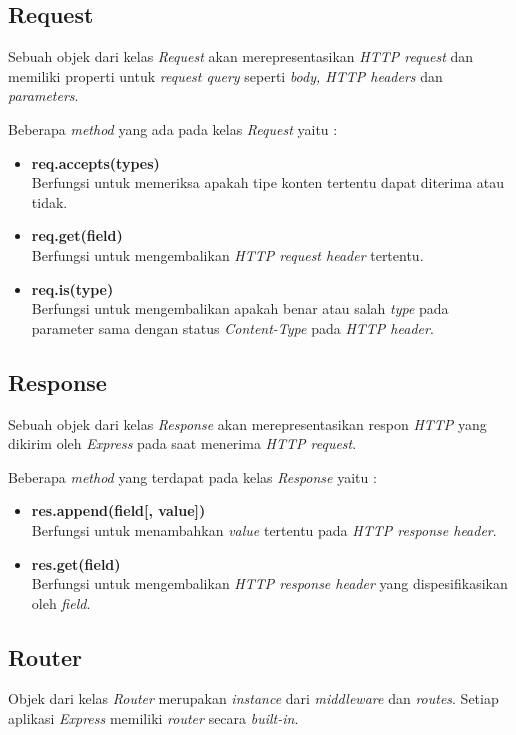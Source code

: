 \subsection{Request}
Sebuah objek dari kelas \textit{Request} akan merepresentasikan \textit{HTTP request} dan memiliki properti untuk \textit{request query} seperti \textit{body, HTTP headers} dan \textit{parameters}. 

Beberapa \textit{method} yang ada pada kelas \textit{Request} yaitu : 
\begin{itemize}
	\item \textbf{req.accepts(types)} \\ Berfungsi untuk memeriksa apakah tipe konten tertentu dapat diterima atau tidak.
	\item \textbf{req.get(field)} \\ Berfungsi untuk mengembalikan \textit{HTTP request header} tertentu.
	\item \textbf{req.is(type)} \\ Berfungsi untuk mengembalikan apakah benar atau salah \textit{type} pada parameter sama dengan status \textit{Content-Type} pada \textit{HTTP header}.
\end{itemize}

\subsection{Response}
Sebuah objek dari kelas \textit{Response} akan merepresentasikan respon \textit{HTTP} yang dikirim oleh \textit{Express} pada saat menerima \textit{HTTP request}.

Beberapa \textit{method} yang terdapat pada kelas \textit{Response} yaitu : 

\begin{itemize}
	\item \textbf{res.append(field[, value])} \\ Berfungsi untuk menambahkan \textit{value} tertentu pada \textit{HTTP response header}.
	\item \textbf{res.get(field)} \\ Berfungsi untuk mengembalikan \textit{HTTP response header} yang dispesifikasikan oleh \textit{field}.
\end{itemize}

\subsection{Router}
Objek dari kelas \textit{Router} merupakan \textit{instance} dari \textit{middleware} dan \textit{routes}. Setiap aplikasi \textit{Express} memiliki \textit{router} secara \textit{built-in}. 

